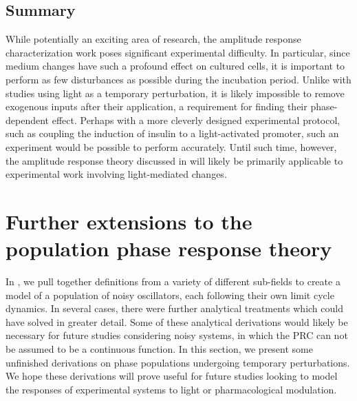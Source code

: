 \subsection{Summary}

While potentially an exciting area of research, the amplitude response characterization work poses significant experimental difficulty.
In particular, since medium changes have such a profound effect on cultured cells, it is important to perform as few disturbances as possible during the incubation period.
Unlike with studies using light as a temporary perturbation, it is likely impossible to remove exogenous inputs after their application, a requirement for finding their phase-dependent effect.
Perhaps with a more cleverly designed experimental protocol, such as coupling the induction of insulin to a light-activated promoter, such an experiment would be possible to perform accurately.
Until such time, however, the amplitude response theory discussed in  will likely be primarily applicable to experimental work involving light-mediated changes.


\section{Further extensions to the population phase response theory}\label{sec:prd}

In , we pull together definitions from a variety of different sub-fields to create a model of a population of noisy oscillators, each following their own limit cycle dynamics. 
In several cases, there were further analytical treatments which could have solved in greater detail.
Some of these analytical derivations would likely be necessary for future studies considering noisy systems, in which the PRC can not be assumed to be a continuous function.
In this section, we present some unfinished derivations on phase populations undergoing temporary perturbations.
We hope these derivations will prove useful for future studies looking to model the responses of experimental systems to light or pharmacological modulation.

